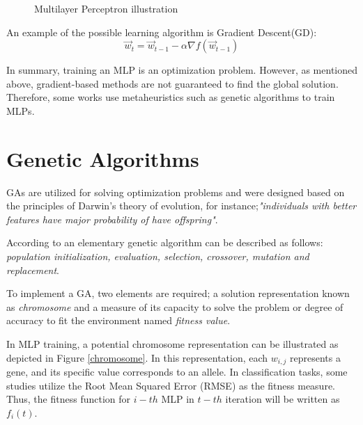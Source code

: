 \documentclass[journal]{IEEEtai}
\begin{document}
\begin{figure}[h]
\caption{Multilayer Perceptron illustration}
\label{MLPe}
\end{figure}

An example of the possible learning algorithm is Gradient Descent(GD):
\begin{equation}
\vec{w}_{t} = \vec{w}_{t-1}  - \alpha \nabla f( \vec{w}_{t-1})
\end{equation}

In summary, training an MLP is an optimization problem. However, as mentioned above, gradient-based methods are not guaranteed to find the global solution. Therefore, some works use metaheuristics such as genetic algorithms to train MLPs.

\section{Genetic Algorithms}

GAs are utilized for solving optimization problems and were designed based on the principles of Darwin's theory of evolution, for instance;\textit{"individuals with better features have major probability of have offspring"}.

According to \cite{ES1} an elementary genetic algorithm can be described as follows: \textit{population initialization,  evaluation, selection, crossover, mutation and  replacement}.


To implement a GA, two elements are required; a solution representation known as \textit{chromosome}  and a  measure of its capacity to solve the problem or  degree of accuracy to fit the environment named  \textit{fitness  value}.

In MLP training, a potential chromosome representation can be illustrated as depicted in Figure \ref{chromosome}. In this representation, each $w_{i,j}$ represents a gene, and its specific value corresponds to an allele. In classification tasks, some studies utilize the Root Mean Squared Error (RMSE) as the fitness measure. Thus, the fitness function  for $i-th$ MLP in $t-th$ iteration will be written as  $f_{i}(t)$.
\end{document}
